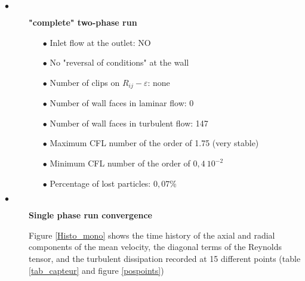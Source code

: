 \documentclass[a4paper,twoside,12pt]{article}
\begin{document}
\begin{description}
   \item[$\bullet$]\textbf{"complete" two-phase run}

         \begin{itemize}
            \item[$\bullet$] Inlet flow at the outlet: NO
            \item[$\bullet$] No "reversal of conditions" at the wall
            \item[$\bullet$] Number of clips on $R_{ij}-\varepsilon$: none
            \item[$\bullet$] Number of wall faces in laminar flow: 0
            \item[$\bullet$] Number of wall faces in turbulent flow: 147
            \item[$\bullet$] Maximum CFL number of the order of 1.75 (very stable)
            \item[$\bullet$] Minimum CFL number of the order of $0,4~10^{-2}$
            \item[$\bullet$] Percentage of lost particles: $0,07$\%
         \end{itemize}

   \item[$\bullet$]\textbf{Single phase run convergence}

         Figure \ref{Histo_mono} shows the time history of the axial and radial components of the mean velocity, the diagonal terms of the Reynolds tensor, and the turbulent dissipation recorded at 15 different points (table \ref{tab_capteur} and figure \ref{pospoints})


\end{description}
\end{document}
